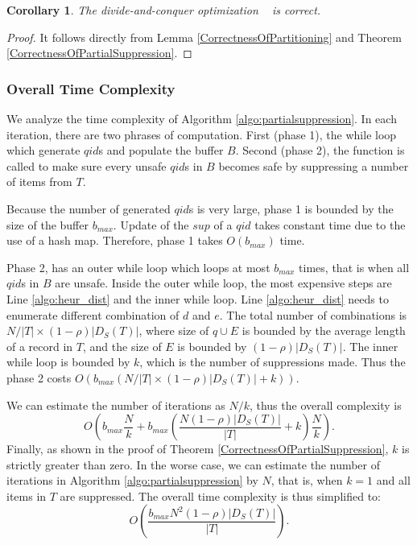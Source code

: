 \newtheorem{Corollary}{Corollary}

\begin{Corollary}
The divide-and-conquer optimization \SplitData~ is correct.
\end{Corollary}
\begin{proof}
It follows directly from Lemma \ref{CorrectnessOfPartitioning} and
Theorem \ref{CorrectnessOfPartialSuppression}. %
\end{proof}

\subsubsection{Overall Time Complexity}
\label{sec:imp}
We analyze the time complexity of Algorithm \ref{algo:partialsuppression}.
In each iteration, there are two phrases of computation. First (phase 1), the while loop which generate $qid$s and populate the buffer $B$. Second (phase 2), 
the \SanitizeBuffer function is called to make sure every 
unsafe $qid$s in $B$ becomes safe by suppressing a number of items from $T$.

Because the number of generated $qid$s is very large, phase 1 is bounded by the size of the buffer $b_{max}$. Update of the $sup$ of a $qid$ takes constant time due to the use of a hash map. Therefore, phase 1 takes $O(b_{max})$ time.

Phase 2, has an outer while loop which
loops at most $b_{max}$ times, that is when all $qid$s in $B$ are unsafe. 
Inside the outer while loop, the most expensive steps are Line \ref{algo:heur_dist} and the inner while loop. 
Line \ref{algo:heur_dist} needs to enumerate different combination of $d$ and $e$. 
The total number of combinations is $N/|T|\times(1-\rho)|D_S(T)|$,
where size of $q \cup E$ is bounded by the average length of a record in $T$,
and the size of $E$ is bounded by $(1-\rho)|D_S(T)|$. The inner while loop
is bounded by $k$, which is the number of suppressions made. 
Thus the phase 2 costs $O(b_{max} (N/|T|\times(1-\rho)|D_S(T)| + k))$.

We can estimate the number of iterations as $N/k$, 
thus the overall complexity is
\[O\left(b_{max}\frac{N}{k} +b_{max}(\frac{ N(1-\rho)|D_S(T)|}{|T|}+ k)
\frac{N}{k}\right).\]
Finally, as shown in the proof of Theorem \ref{CorrectnessOfPartialSuppression},
$k$ is strictly greater than zero. In the worse case, we can estimate the number of 
iterations in  Algorithm \ref{algo:partialsuppression} by $N$, that is, when
$k=1$ and all items in $T$ are suppressed. The overall time complexity
is thus simplified to:
\begin{equation}
O\left(\frac{b_{max} N^2(1-\rho)|D_S(T)|}{|T|}\right). \label{eq:timecomp}
\end{equation}

